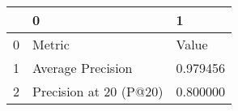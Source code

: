 \begin{tabular}{lll}
\toprule
 & 0 & 1 \\
\midrule
0 & Metric & Value \\
1 & Average Precision & 0.979456 \\
2 & Precision at 20 (P@20) & 0.800000 \\
\bottomrule
\end{tabular}
